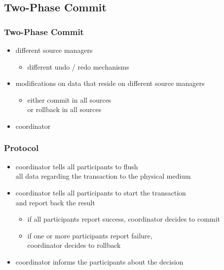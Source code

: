 \documentclass[dvipsnames]{beamer}
\theoremstyle{plain}
\begin{document}
\subsection{Two-Phase Commit}

\begin{frame}
  \frametitle{Two-Phase Commit}

  \begin{itemize}
    \item different source managers
    \begin{itemize}
      \item different undo / redo mechanisms
    \end{itemize}

    \pause
    \item modifications on data that reside on different source managers
    \begin{itemize}
      \item either commit in all sources\\
        or rollback in all sources
    \end{itemize}

    \pause
    \item \alert{coordinator}
  \end{itemize}
\end{frame}

\begin{frame}
  \frametitle{Protocol}

  \begin{itemize}
    \item coordinator tells all participants to flush\\
      all data regarding the transaction to the physical medium

    \pause
    \item coordinator tells all participants to start the transaction\\
      and report back the result
    \begin{itemize}
      \item if all participants report success, coordinator decides to
        commit
      \item if one or more participants report failure,\\
	coordinator decides to rollback
    \end{itemize}

    \pause
    \item coordinator informs the participants about the decision
  \end{itemize}
\end{frame}
\end{document}
